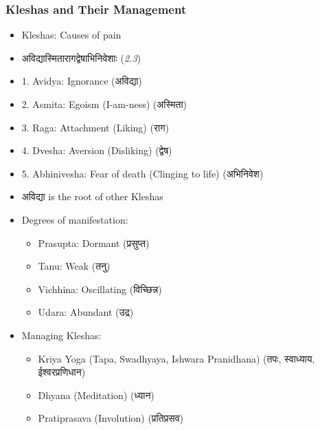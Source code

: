 \begin{frame}[fragile]\frametitle{Kleshas and Their Management}
    \begin{itemize}
        \item Kleshas: Causes of pain
        \item अविद्यास्मितारागद्वेषाभिनिवेशाः (\textit{2.3})
        \item 1. Avidya: Ignorance (अविद्या)
        \item 2. Asmita: Egoism (I-am-ness) (अस्मिता)
        \item 3. Raga: Attachment (Liking) (राग)
        \item 4. Dvesha: Aversion (Disliking) (द्वेष)
        \item 5. Abhinivesha: Fear of death (Clinging to life) (अभिनिवेश)
        \item अविद्या is the root of other Kleshas
        \item Degrees of manifestation:
        \begin{itemize}
            \item Prasupta: Dormant (प्रसुप्त)
            \item Tanu: Weak (तनु)
            \item Vichhina: Oscillating (विच्छिन्न)
            \item Udara: Abundant (उद्र)
        \end{itemize}
        \item Managing Kleshas:
        \begin{itemize}
            \item Kriya Yoga (Tapa, Swadhyaya, Ishwara Pranidhana) (तपः, स्वाध्याय, ईश्वरप्रणिधान)
            \item Dhyana (Meditation) (ध्यान)
            \item Pratiprasava (Involution) (प्रतिप्रसव)
        \end{itemize}
    \end{itemize}
\end{frame}

